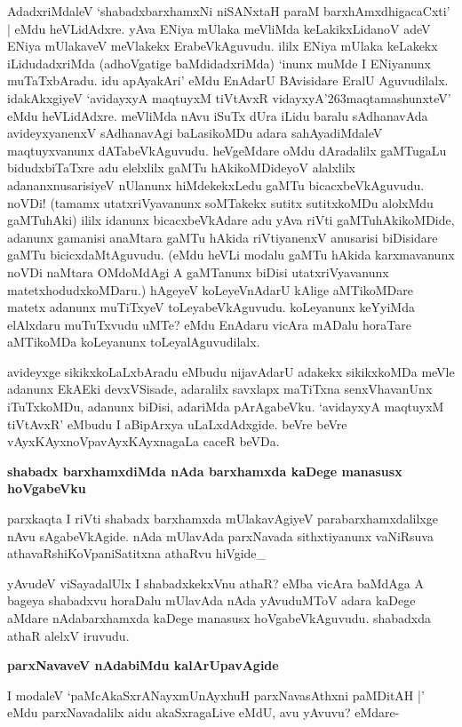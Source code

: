 \noindent
AdadxriMdaleV `shabadxbarxhamxNi niSANxtaH paraM barxhAmxdhigacaCxti' | eMdu heVLidAdxre. yAva ENiya mU\-laka meVliMda keLakikxLidanoV adeV ENiya mUlakaveV meVlakekx ErabeVkAguvudu. ililx ENiya mU\-laka keLakekx iLidudadxriMda (adhoVgatige baMdidadxriMda) `inunx muMde I ENiyanunx muTaTx\-bAradu. idu apAyakAri' eMdu EnAdarU BAvisidare EralU Aguvudilalx. idakAkxgiyeV `avidayxyA maqtuyxM\- tiVtAvxR\label{160} vidayxyA\char'263maqtamashunxteV' eMdu heVLidAdxre. meVliMda nAvu iSuTx dUra iLidu baralu\- sAdhanavAda avideyxyanenxV sAdhanavAgi baLasikoMDu adara sahAyadiMdaleV maqtuyxvanunx dATa\-beVkAguvudu. heVgeMdare oMdu dAradalilx gaMTugaLu bidudxbiTaTxre adu elelxlilx gaMTu hAkikoMDi\-deyoV alalxlilx adananxnusarisiyeV nUlanunx hiMdekekxLedu gaMTu bicacxbeVkAguvudu. noVDi! (tamamx utatxriVyavanunx soMTakekx sutitx sutitxkoMDu alolxMdu gaMTuhAki) ililx idanunx bicacxbeVkAdare adu yAva riVti gaMTuhAkikoMDide, adanunx gamanisi anaMtara gaMTu hAkida riVtiyanenxV anusarisi biDisi\-dare gaMTu bicicxdaMtAguvudu. (eMdu heVLi modalu gaMTu hAkida karxmavanunx noVDi naMtara\- OMdoM\-dAgi A gaMTanunx biDisi utatxriVyavanunx matetxhodudxkoMDaru.) hAgeyeV koLeyeVnAdarU kAlige aMTikoMDare matetx adanunx muTiTxyeV toLeyabeVkAguvudu. koLeyanunx keYyiMda elAlx\-daru muTuTxvudu uMTe? eMdu EnAdaru vicAra mADalu horaTare aMTikoMDa koLe\-yanunx toLeyalAguvudilalx.

avideyxge sikikxkoLaLxbAradu eMbudu nijavAdarU adakekx sikikxkoMDa meVle adanunx EkAEki devxVSi\-sade, adaralilx savxlapx maTiTxna senxVhavanUnx iTuTxkoMDu, adanunx biDisi, adariMda pArAgabeVku. `avi\-dayxyA maqtuyxM tiVtAvxR'\label{161} eMbudu I aBipArxya uLaLxdAdxgide. beVre beVre vAyxKAyxnoVpavAyxKAyxna\-gaLa caceR beVDa.

{\bigskip
\noindent
{\large\bf shabadx barxhamxdiMda nAda barxhamxda kaDege manasusx hoVgabeVku}}\label{page161}
\medskip

\noindent
parxkaqta I riVti shabadx barxhamxda mUlakavAgiyeV parabarxhamxdalilxge nAvu sAgabeVkAgide. nAda mUla\-vAda parxNavada sithxtiyanunx vaNiRsuva athavaRshiKoVpaniSatitxna athaRvu hiVgide\_

yAvudeV viSayadalUlx I shabadxkekxVnu athaR? eMba vicAra baMdAga A bageya shabadxvu hora\-Dalu mUlavAda nAda yAvuduMToV adara kaDege aMdare nAdabarxhamxda kaDege manasusx hoVga\-beVkAgu\-vudu. shabadxda athaR alelxV iruvudu.

{\bigskip
\noindent
{\large\bf parxNavaveV nAdabiMdu kalArUpavAgide}}\label{page161}
\medskip

\noindent
I modaleV `paMcAkaSxrANayxmUnAyxhuH parxNavasAthxni paMDitAH |' eMdu parxNavadalilx aidu akaSxra\-gaLive eMdU, avu yAvuvu? eMdare- 

